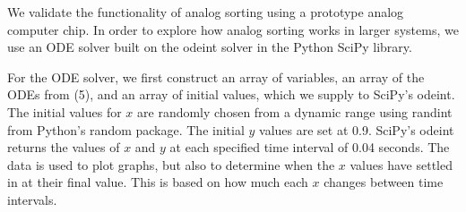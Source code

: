 We validate the functionality of analog sorting using a prototype analog computer chip.
In order to explore how analog sorting works in larger systems, we use an ODE solver built on the odeint solver in the Python SciPy library.

For the ODE solver, we first construct an array of variables, an array of the ODEs from (5), and an array of initial values, which we supply to SciPy's odeint. The initial values for $x$ are randomly chosen from a dynamic range using randint from Python's random package. The initial $y$ values are set at 0.9. SciPy's odeint returns the values of $x$ and $y$ at each specified time interval of 0.04 seconds. The data is used to plot graphs, but also to determine when the $x$ values have settled in at their final value. This is based on how much each $x$ changes between time intervals.



